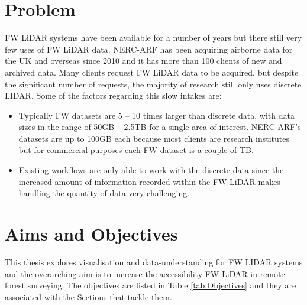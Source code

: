 \documentclass{subfiles}
\begin{document}
\section{Problem}\label{sec:Problem}
\par FW LiDAR systems have been available for a number of years but there still very few uses of FW LiDAR data. NERC-ARF has been acquiring airborne data for the UK and overseas since 2010 and it has more than 100 clients of new and archived data. Many clients request FW LiDAR data to be acquired, but despite the significant number of requests, the majority of research still only uses discrete LIDAR. Some of the factors regarding this slow intakes are:
\begin{itemize}
	\item Typically FW datasets are 5 – 10 times larger than discrete data, with data sizes in the range of 50GB – 2.5TB for a single area of interest. NERC-ARF's datasets are up to 100GB each because most clients are research institutes but for commercial purposes each FW dataset is a couple of TB.
	\item Existing workflows are only able to work with the discrete data since the increased amount of information recorded within the FW LiDAR makes handling the quantity of data very challenging.
\end{itemize}

\newpage

\section {Aims and Objectives}\label{sec:AimsObjectives}
	
\par This thesis explores visualisation and data-understanding for FW LIDAR systems and the overarching aim is to increase the accessibility FW LiDAR in remote forest surveying. The objectives are listed in Table \ref{tab:Objectives} and they are associated with the Sections that tackle them.
\end{document}
